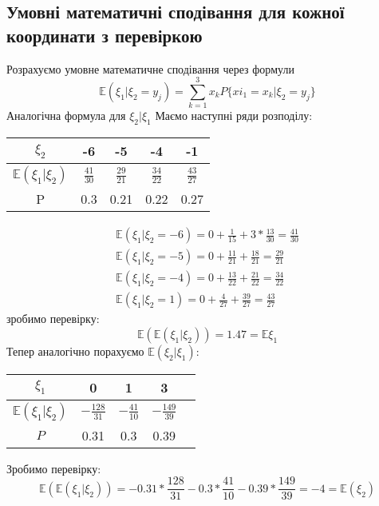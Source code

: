 \documentclass{article}
\begin{document}
	\subsection{Умовні математичні сподівання для кожної координати з перевіркою}
	
	Розрахуємо умовне математичне сподівання через формули 
	$$
	\mathbb{E}(\xi_1\vert\xi_2=y_j) = \sum_{k=1}^3 x_kP\{ xi_1=x_k\vert\xi_2=y_j \}
	$$
	Аналогічна формула для $\xi_2\vert\xi_1$
	Маємо наступні ряди розподілу:
	\begin{center}
	\begin{tabular}{|c|c|c|c|c|}
	\hline
		$\xi_2$ & -6 & -5 & -4 & -1 \\ \hline
		$\mathbb{E}(\xi_1\vert\xi_2)$ & $\frac{41}{30}$ & $\frac{29}{21}$ & $\frac{34}{22}$ & $\frac{43}{27}$ \\ \hline
		P & 0.3 & 0.21 & 0.22 & 0.27 \\ \hline
	\end{tabular}
	\end{center}
	\[
	\begin{gathered}
		\mathbb{E}(\xi_1|\xi_2 = -6) = 0 + \frac{1}{15} + 3 * \frac{13}{30} = \frac{41}{30}\\
		\mathbb{E}(\xi_1|\xi_2 = -5) = 0 + \frac{11}{21} +  \frac{18}{21} = \frac{29}{21}\\
		\mathbb{E}(\xi_1|\xi_2 = -4) = 0 + \frac{13}{22} + \frac{21}{22} = \frac{34}{22}\\
		\mathbb{E}(\xi_1|\xi_2 = 1) = 0 + \frac{4}{27} + \frac{39}{27} = \frac{43}{27}
	\end{gathered}		
	\]
	зробимо перевірку:
	\[
	\mathbb{E}(\mathbb{E}(\xi_1|\xi_2)) = 1.47 = \mathbb{E}\xi_1
	\]
	Тепер аналогічно порахуємо $\mathbb{E}(\xi_2|\xi_1)$:
	\begin{center}
	\begin{tabular}{|c|c|c|c|c|}
	\hline
		$\xi_1$ & 0 & 1 & 3 \\ \hline
		$\mathbb{E}(\xi_1|\xi_2)$ & $-\frac{128}{31}$ & $-\frac{41}{10}$ & $-\frac{149}{39}$ \\ \hline
		$P$ & 0.31 & 0.3 & 0.39 \\ \hline
	\end{tabular}
	\end{center}
	Зробимо перевірку:
	\[
		\mathbb{E}(\mathbb{E}(\xi_1|\xi_2))	= - 0.31 * \frac{128}{31} - 0.3 * \frac{41}{10} - 0.39 * \frac{149}{39} = -4 = \mathbb{E}(\xi_2)
	\]
	\newpage
\end{document}
